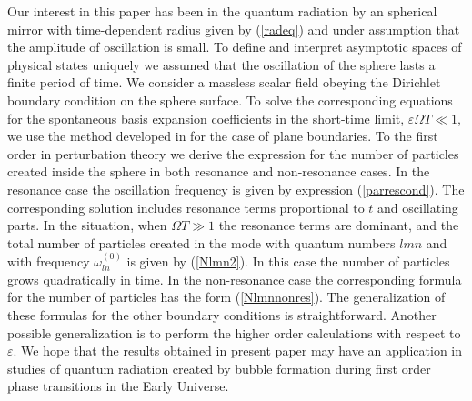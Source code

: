 \documentclass[a4paper,11pt]{article}
\begin{document}
Our interest in this paper has been in the quantum radiation by an
spherical mirror with time-dependent radius given by (\ref{radeq})
and under assumption that the amplitude of oscillation is small.
To define and interpret asymptotic spaces of physical states
uniquely we assumed that the oscillation of the sphere lasts a
finite period of time. We consider a massless scalar field obeying
the Dirichlet boundary condition on the sphere surface. To solve
the corresponding equations for the spontaneous basis expansion
coefficients in the short-time limit, $\varepsilon \Omega T\ll 1$,
we use the method developed in \cite{Ji} for the case of plane
boundaries. To the first order in perturbation theory we derive
the expression for the number of particles created inside the
sphere in both resonance and non-resonance cases. In the resonance
case the oscillation frequency is given by expression
(\ref{parrescond}). The corresponding solution includes resonance
terms proportional to $t$ and oscillating parts. In the situation,
when $\Omega T\gg 1$ the resonance terms are dominant, and the
total number of particles created in the mode with quantum numbers
$lmn$ and with frequency $\omega _{ln}^{(0)}$ is given by
(\ref{Nlmn2}). In this case the number of particles grows
quadratically in time. In the non-resonance case the corresponding
formula for the number of particles has the form
(\ref{Nlmnnonres}). The generalization of these formulas for the
other boundary conditions is straightforward. Another possible
generalization is to perform the higher order calculations with
respect to $\varepsilon $. We hope that the results obtained in
present paper may have an application in studies of quantum
radiation created by bubble formation during first order phase
transitions in the Early Universe.
\end{document}
